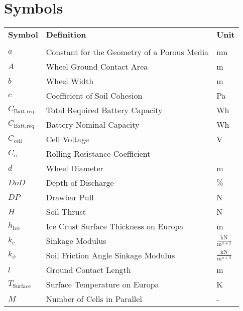 \chapter*{Symbols}



\renewcommand{\arraystretch}{1.2}

\begin{longtable}[l]{lll}

	\textbf{Symbol}	&	\textbf{Definition}	\hspace{8cm}	&	\textbf{Unit}	\\ \\
	

\(a\)					&	Constant for the Geometry of a Porous Media	& nm							\\
\(A\)					&	Wheel Ground Contact Area					& m								\\
\(b\)					&	Wheel Width 								& m								\\
\(c\)					&	Coefficient of Soil Cohesion				& Pa							\\
$C_\text{Batt,req}$		&	Total Required Battery Capacity				& Wh							\\
$C_\text{Batt,req}$		&	Battery Nominal Capacity					& Wh							\\
$C_\text{cell}$			&	Cell Voltage								& V								\\
\(C_\text{rr}\)		&	Rolling Resistance Coefficient					& -								\\	
\(d\)					&	Wheel Diameter								& m								\\
$DoD$					&	Depth of Discharge							& $\%$							\\
\(DP\)					&	Drawbar Pull								& N								\\
\(H\)					&	Soil Thrust									& N								\\
\(h_\text{Ice}\)		&	Ice Crust Surface Thickness on Europa		&	m							\\
\(k_\text{c}\)			&	Sinkage Modulus								& \(\frac{\text{kN}}{\text{m}^{n+2}}\) \\
\(k_\phi\)				&	Soil Friction Angle Sinkage Modulus			& \(\frac{\text{kN}}{\text{m}^{n+3}}\) \\
\(l\)					&	Ground Contact Length						& m								\\
\(T_\text{Surface}\)	&	Surface Temperature on Europa				&	K							\\
$M$						&	Number of Cells in Parallel					& -								\\

\end{longtable}
